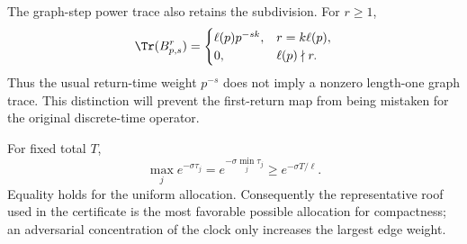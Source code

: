 The graph-step power trace also retains the subdivision.  For $r\ge1$,
\begin{equation}
\Tr(B_{p,s}^{r})=
\begin{cases}
\ell(p)p^{-sk},&r=k\ell(p),\\
0,&\ell(p)\nmid r.
\end{cases}
\label{eq:block-traces}
\end{equation}
Thus the usual return-time weight $p^{-s}$ does not imply a nonzero
length-one graph trace.  This distinction will prevent the first-return map
from being mistaken for the original discrete-time operator.

\begin{remark}
For fixed total $T$,
\[
\max_j e^{-\sigma\tau_j}
=e^{-\sigma\min_j\tau_j}
\ge e^{-\sigma T/\ell}.
\]
Equality holds for the uniform allocation.  Consequently the representative
roof used in the certificate is the most favorable possible allocation for
compactness; an adversarial concentration of the clock only increases the
largest edge weight.
\end{remark}
